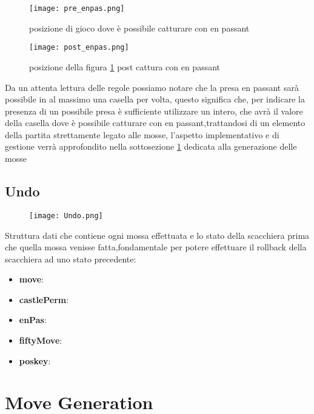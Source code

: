 \begin{figure}[H]
    \centering
    \begin{minipage}[b]{0.4\textwidth}
        \texttt{[image: pre\_enpas.png]}
        \caption{posizione di gioco dove è possibile catturare con en passant}
        \label{pre_enpas}
    \end{minipage}
    \hfill
    \begin{minipage}[b]{0.4\textwidth}
        \texttt{[image: post\_enpas.png]}
        \caption{posizione della figura \ref{pre_enpas} post cattura con en passant}
    \end{minipage}
\end{figure}
Da un attenta lettura delle regole possiamo notare che la presa en passant sarà possibile in al massimo una casella per volta,
questo significa che, per indicare la presenza di un possibile presa è sufficiente utilizzare un intero, che avrà il valore della casella dove è
possibile catturare con en passant,trattandosi di un elemento della partita strettamente legato alle mosse, l'aspetto implementativo e di gestione verrà approfondito nella sottosezione \ref{move generation} dedicata alla generazione delle mosse


\subsection{Undo}
\label{undo}
\begin{figure}[H]
    \centering
    \texttt{[image: Undo.png]}
\end{figure}
Struttura dati che contiene ogni mossa effettuata e lo stato della scacchiera prima che quella mossa venisse fatta,fondamentale per potere effettuare
il rollback della scacchiera ad uno stato precedente:
\begin{itemize}
    \item   \textbf{move}:
    \item   \textbf{castlePerm}:
    \item   \textbf{enPas}:
    \item   \textbf{fiftyMove}:
    \item   \textbf{poskey}:
\end{itemize}



\section{Move Generation} %
\label{move generation}

